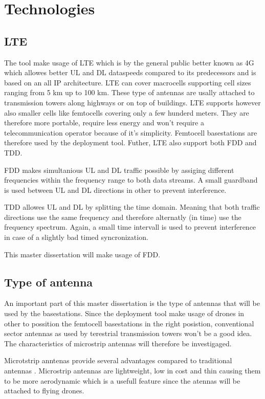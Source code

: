 \section{Technologies}
\subsection{LTE}
The tool make usage of \gls{LTE} which is by the general public better known as 4G which allowes better \gls{UL} and \gls{DL} dataspeeds 
compared to its predecessors and is based on an all IP architecture. LTE can cover macrocells supporting cell sizes ranging from 5 km up to 100 km. 
These type of antennas are usally attached to transmission towers along highways or on top of buildings. LTE supports however also smaller cells like
femtocells covering only a few hunderd meters. They are therefore more portable, require less energy and won't require a telecommunication operator because
of it's simplicity. Femtocell basestations are therefore used by the deployment tool.
Futher, \gls{LTE} also support both \gls{FDD} and \gls{TDD}.

\gls{FDD} makes simultanious \gls{UL} and \gls{DL} traffic possible by assiging different frequencies within the frequency range 
to both data streams. A small guardband is used between \gls{UL} and \gls{DL} directions in other to prevent interference.

\gls{TDD} allowes  \gls{UL} and \gls{DL} by splitting the time domain. Meaning that both traffic directions use the same frequency and therefore
alternatly (in time) use the frequency spectrum. Again, a small time intervall is used to prevent interference in case of a slightly bad timed syncronization.

This master dissertation will make usage of \gls{FDD}.


\subsection{Type of antenna} %

An important part of this master dissertation is the type of antennas that will be used by the basestations. Since the deployment tool make usage
of drones in other to possition the femtocell basestations in the right posistion,  conventional 
sector antennas as used by terestrial transmission towers won't be a good idea. The characteristics of microstrip antennas will therefore be investigaged.

Microtstrip anntenas provide several advantages compared to traditional antennas \cite{J13_singh2011micro, J14_antennadesign}. Microstrip antennas
are lightweight, low in cost and thin causing them to be more aerodynamic which is  a usefull feature since the atennas will be attached
to flying drones.


